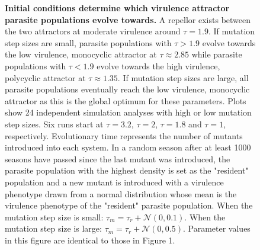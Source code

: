 \documentclass{article}
\begin{document}
\begin{figure}[hb!]
    \caption{\textbf{Initial conditions determine which virulence attractor parasite populations evolve towards.} A repellor exists between the two attractors at moderate virulence around $\tau = 1.9$. If mutation step sizes are small, parasite populations with $\tau > 1.9$ evolve towards the low virulence, monocyclic attractor at $\tau \approx 2.85$ while parasite populations with $\tau < 1.9$ evolve towards the high virulence, polycyclic attractor at $\tau \approx 1.35$. If mutation step sizes are large, all parasite populations eventually reach the low virulence, monocyclic attractor as this is the global optimum for these parameters. Plots show 24 independent simulation analyses with high or low mutation step sizes. Six runs start at $\tau = 3.2$, $\tau = 2$, $\tau = 1.8$ and $\tau = 1$, respectively. Evolutionary time represents the number of mutants introduced into each system. In a random season after at least 1000 seasons have passed since the last mutant was introduced, the parasite population with the highest density is set as the "resident" population and a new mutant is introduced with a virulence phenotype drawn from a normal distribution whose mean is the virulence phenotype of the "resident" parasite population. When the mutation step size is small: $\tau_{m} = \tau_{r} + \mathcal{N}(0,0.1)$. When the mutation step size is large: $\tau_{m} = \tau_{r} + \mathcal{N}(0,0.5)$. Parameter values in this figure are identical to those in Figure 1.
    }
\end{figure}
\end{document}
